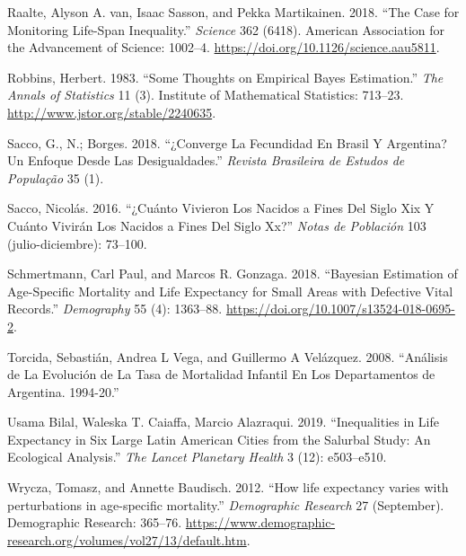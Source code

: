 \documentclass[12pt,]{article}
\begin{document}
\leavevmode\hypertarget{ref-van_Raalte1002}{}%
Raalte, Alyson A. van, Isaac Sasson, and Pekka Martikainen. 2018. ``The
Case for Monitoring Life-Span Inequality.'' \emph{Science} 362 (6418).
American Association for the Advancement of Science: 1002--4.
\url{https://doi.org/10.1126/science.aau5811}.

\leavevmode\hypertarget{ref-Robbins1983}{}%
Robbins, Herbert. 1983. ``Some Thoughts on Empirical Bayes Estimation.''
\emph{The Annals of Statistics} 11 (3). Institute of Mathematical
Statistics: 713--23. \url{http://www.jstor.org/stable/2240635}.

\leavevmode\hypertarget{ref-SaccoBorges2018}{}%
Sacco, G., N.; Borges. 2018. ``¿Converge La Fecundidad En Brasil Y
Argentina? Un Enfoque Desde Las Desigualdades.'' \emph{Revista
Brasileira de Estudos de População} 35 (1).

\leavevmode\hypertarget{ref-Sacco2016}{}%
Sacco, Nicolás. 2016. ``¿Cuánto Vivieron Los Nacidos a Fines Del Siglo
Xix Y Cuánto Vivirán Los Nacidos a Fines Del Siglo Xx?'' \emph{Notas de
Población} 103 (julio-diciembre): 73--100.

\leavevmode\hypertarget{ref-Schmertmann2018}{}%
Schmertmann, Carl Paul, and Marcos R. Gonzaga. 2018. ``Bayesian
Estimation of Age-Specific Mortality and Life Expectancy for Small Areas
with Defective Vital Records.'' \emph{Demography} 55 (4): 1363--88.
\url{https://doi.org/10.1007/s13524-018-0695-2}.

\leavevmode\hypertarget{ref-Torcida2008}{}%
Torcida, Sebastián, Andrea L Vega, and Guillermo A Velázquez. 2008.
``Análisis de La Evolución de La Tasa de Mortalidad Infantil En Los
Departamentos de Argentina. 1994-20.''

\leavevmode\hypertarget{ref-Bilal2019}{}%
Usama Bilal, Waleska T. Caiaffa, Marcio Alazraqui. 2019. ``Inequalities
in Life Expectancy in Six Large Latin American Cities from the Salurbal
Study: An Ecological Analysis.'' \emph{The Lancet Planetary Health} 3
(12): e503--e510.

\leavevmode\hypertarget{ref-Wrycza2012}{}%
Wrycza, Tomasz, and Annette Baudisch. 2012. ``How life expectancy varies
with perturbations in age-specific mortality.'' \emph{Demographic
Research} 27 (September). Demographic Research: 365--76.
\url{https://www.demographic-research.org/volumes/vol27/13/default.htm}.
\end{document}
